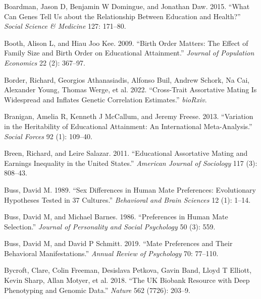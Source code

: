 \documentclass[
]{article}
\newlength{\cslhangindent}
\newlength{\cslentryspacingunit} %
\newenvironment{CSLReferences}[2] %
 {%
  \setlength{\parindent}{0pt}
  \ifodd #1
  \let\oldpar\par
  \def\par{\hangindent=\cslhangindent\oldpar}
  \fi
  \setlength{\parskip}{#2\cslentryspacingunit}
 }%
 {}
\theoremstyle{definition}
\theoremstyle{definition}
\theoremstyle{definition}
\theoremstyle{definition}
\theoremstyle{remark}
\begin{document}
\begin{CSLReferences}{1}{0}
\leavevmode{}%
Boardman, Jason D, Benjamin W Domingue, and Jonathan Daw. 2015. {``What Can Genes Tell Us about the Relationship Between Education and Health?''} \emph{Social Science \& Medicine} 127: 171--80.

\leavevmode{}%
Booth, Alison L, and Hiau Joo Kee. 2009. {``Birth Order Matters: The Effect of Family Size and Birth Order on Educational Attainment.''} \emph{Journal of Population Economics} 22 (2): 367--97.

\leavevmode{}%
Border, Richard, Georgios Athanasiadis, Alfonso Buil, Andrew Schork, Na Cai, Alexander Young, Thomas Werge, et al. 2022. {``Cross-Trait Assortative Mating Is Widespread and Inflates Genetic Correlation Estimates.''} \emph{bioRxiv}.

\leavevmode{}%
Branigan, Amelia R, Kenneth J McCallum, and Jeremy Freese. 2013. {``Variation in the Heritability of Educational Attainment: An International Meta-Analysis.''} \emph{Social Forces} 92 (1): 109--40.

\leavevmode{}%
Breen, Richard, and Leire Salazar. 2011. {``Educational Assortative Mating and Earnings Inequality in the United States.''} \emph{American Journal of Sociology} 117 (3): 808--43.

\leavevmode{}%
Buss, David M. 1989. {``Sex Differences in Human Mate Preferences: Evolutionary Hypotheses Tested in 37 Cultures.''} \emph{Behavioral and Brain Sciences} 12 (1): 1--14.

\leavevmode{}%
Buss, David M, and Michael Barnes. 1986. {``Preferences in Human Mate Selection.''} \emph{Journal of Personality and Social Psychology} 50 (3): 559.

\leavevmode{}%
Buss, David M, and David P Schmitt. 2019. {``Mate Preferences and Their Behavioral Manifestations.''} \emph{Annual Review of Psychology} 70: 77--110.

\leavevmode{}%
Bycroft, Clare, Colin Freeman, Desislava Petkova, Gavin Band, Lloyd T Elliott, Kevin Sharp, Allan Motyer, et al. 2018. {``The UK Biobank Resource with Deep Phenotyping and Genomic Data.''} \emph{Nature} 562 (7726): 203--9.


\end{CSLReferences}
\end{document}
